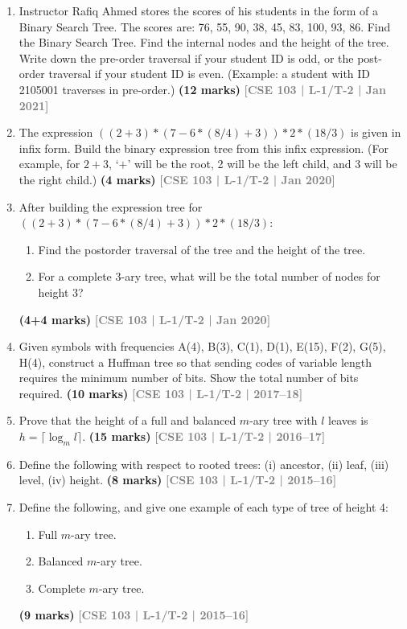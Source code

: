 \documentclass[12pt,a3paper]{article}
\newcommand{\yr}[1]{\hfill\textcolor{gray}{\small\textbf{[#1]}}}
\newcommand{\mk}[1]{\textcolor{orange!70!black}{\small\textbf{(#1 marks)}}}
\begin{document}
\begin{enumerate}
\item Instructor Rafiq Ahmed stores the scores of his students in the form of a Binary Search Tree. The scores are: 76, 55, 90, 38, 45, 83, 100, 93, 86. Find the Binary Search Tree. Find the internal nodes and the height of the tree. Write down the pre-order traversal if your student ID is odd, or the post-order traversal if your student ID is even. (Example: a student with ID 2105001 traverses in pre-order.)
\mk{12} \yr{CSE 103 | L-1/T-2 | Jan 2021}

\item The expression $((2+3) * (7 - 6*(8/4) + 3)) * 2 * (18/3)$ is given in infix form. Build the binary expression tree from this infix expression. (For example, for $2+3$, `$+$' will be the root, 2 will be the left child, and 3 will be the right child.)
\mk{4} \yr{CSE 103 | L-1/T-2 | Jan 2020}

\item After building the expression tree for $((2+3)*(7-6*(8/4)+3))*2*(18/3)$:
\begin{enumerate}
  \item Find the postorder traversal of the tree and the height of the tree.
  \item For a complete 3-ary tree, what will be the total number of nodes for height 3?
\end{enumerate}
\mk{4+4} \yr{CSE 103 | L-1/T-2 | Jan 2020}

\item Given symbols with frequencies A(4), B(3), C(1), D(1), E(15), F(2), G(5), H(4), construct a Huffman tree so that sending codes of variable length requires the minimum number of bits. Show the total number of bits required.
\mk{10} \yr{CSE 103 | L-1/T-2 | 2017--18}  


\item Prove that the height of a full and balanced $m$-ary tree with $l$ leaves is $h = \lceil \log_m l \rceil$.
\mk{15} \yr{CSE 103 | L-1/T-2 | 2016--17}

\item Define the following with respect to rooted trees: (i) ancestor, (ii) leaf, (iii) level, (iv) height.
\mk{8} \yr{CSE 103 | L-1/T-2 | 2015--16}

\item Define the following, and give one example of each type of tree of height 4:
\begin{enumerate}
  \item Full $m$-ary tree.
  \item Balanced $m$-ary tree.
  \item Complete $m$-ary tree.
\end{enumerate}
\mk{9} \yr{CSE 103 | L-1/T-2 | 2015--16}


\end{enumerate}
\end{document}
